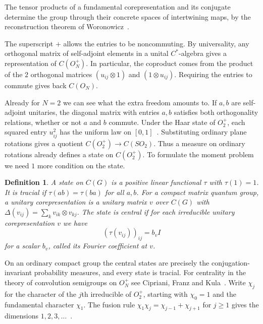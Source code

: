 \documentclass[11pt,a4paper]{article}
\newtheorem{defn}[thm]{Definition}
\begin{document}
The tensor products of a fundamental corepresentation and its conjugate determine the group through their concrete spaces of intertwining maps, by the reconstruction theorem of Woronowicz~\cite{woro-tk}.

The superscript $+$ allows the entries to be noncommuting. By universality, any orthogonal matrix of self-adjoint elements in a unital $C^*$-algebra gives a representation of $C(O_N^+)$. In particular, the coproduct comes from the product of the $2$ orthogonal matrices $(u_{ij}\otimes1)$ and $(1\otimes u_{ij})$. Requiring the entries to commute gives back $C(O_N)$.

Already for $N=2$ we can see what the extra freedom amounts to. If $a,b$ are self-adjoint unitaries, the diagonal matrix with entries $a,b$ satisfies both orthogonality relations, whether or not $a$ and $b$ commute. Under the Haar state of $O_2^+$, each squared entry $u_{ij}^2$ has the uniform law on $[0,1]$~\cite{bc-integration}. Substituting ordinary plane rotations gives a quotient $C(O_2^+)\to C(SO_2)$. Thus a measure on ordinary rotations already defines a state on $C(O_2^+)$. To formulate the moment problem we need $1$ more condition on the state.

\begin{samepage}
\begin{defn}
A state on $C(G)$ is a positive linear functional $\tau$ with $\tau(1)=1$. It is tracial if $\tau(ab)=\tau(ba)$ for all $a,b$. For a compact matrix quantum group, a unitary corepresentation is a unitary matrix $v$ over $C(G)$ with $\Delta(v_{ij})=\sum_k v_{ik}\otimes v_{kj}$. The state is central if for each irreducible unitary corepresentation $v$ we have
\[
 (\tau(v_{ij}))_{ij}=b_v I
\]
for a scalar $b_v$, called its Fourier coefficient at $v$.
\end{defn}
\end{samepage}

On an ordinary compact group the central states are precisely the conjugation-invariant probability measures, and every state is tracial. For centrality in the theory of convolution semigroups on $O_N^+$ see Cipriani, Franz and Kula~\cite{cfk}. Write $\chi_j$ for the character of the $j$th irreducible of $O_2^+$, starting with $\chi_0=1$ and the fundamental character $\chi_1$. The fusion rule $\chi_1\chi_j=\chi_{j-1}+\chi_{j+1}$ for $j\geq1$ gives the dimensions $1,2,3,\ldots$~\cite{banica-book}.
\end{document}
